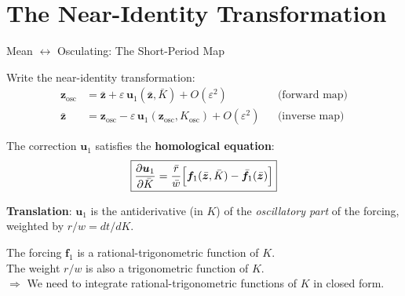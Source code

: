 \documentclass[aspectratio=169, 11pt]{beamer}
\newcommand{\eps}{\varepsilon}
\begin{document}
\section{The Near-Identity Transformation}

\begin{frame}{Mean $\leftrightarrow$ Osculating: The Short-Period Map}

Write the near-identity transformation:
\begin{align*}
\bm z_{\text{osc}} &= \bar{\bm z}
+ \eps\,\bm u_1(\bar{\bm z}, \bar K) + O(\eps^2)
& &\text{(forward map)} \\[4pt]
\bar{\bm z} &= \bm z_{\text{osc}}
- \eps\,\bm u_1(\bm z_{\text{osc}}, K_{\text{osc}}) + O(\eps^2)
& &\text{(inverse map)}
\end{align*}

\vspace{-0.3em}
The correction $\bm u_1$ satisfies the \textbf{homological equation}:
\[
\boxed{
\frac{\partial \bm u_1}{\partial \bar K}
= \frac{\bar r}{\bar w}
\Bigl[
\bm f_1(\bar{\bm z}, \bar K)
- \bar{\bm f}_1(\bar{\bm z})
\Bigr]
}
\]

\vspace{0.2em}
\textbf{Translation}: $\bm u_1$ is the antiderivative (in $K$) of the
\emph{oscillatory part} of the forcing, weighted by $r/w = dt/dK$.

\vspace{0.3em}
The forcing $\bm f_1$ is a rational-trigonometric function of $K$.\\
The weight $r/w$ is also a trigonometric function of $K$.\\[0.2em]
$\Rightarrow$ We need to \alert{integrate rational-trigonometric functions
of $K$} in closed form.

\end{frame}
\end{document}
